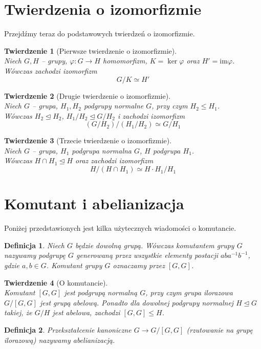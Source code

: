 \documentclass[licencjacka]{pracamgr}
\newtheorem{deff}{Definicja}[section]
\newtheorem{thh}{Twierdzenie}[section]
\begin{document}
\section{Twierdzenia o izomorfizmie}
Przejdźmy teraz do podstawowych twierdzeń o izomorfizmie.
\begin{thh}[Pierwsze twierdzenie o izomorfizmie] $ $ \\
	Niech $G, H$ -- grupy, 	$ \varphi \colon G \to H$ homomorfizm, $K = \ker{\varphi}$ oraz $H' = \mathrm{im}\varphi $. \\
	Wówczas zachodzi izomorfizm $$G/K \simeq H'$$
\end{thh}
\begin{thh}[Drugie twierdzenie o izomorfizmie]$ $\\
	Niech $G$ -- grupa, 	$H_1, H_2$ podgrupy normalne $G$, przy czym $H_2 \leq H_1$. \\
	Wówczas $H_2 \trianglelefteq H_2$, $H_1/H_2 \trianglelefteq G/H_2$ i zachodzi izomorfizm
	$$ (G/H_2) / (H_1/H_2) \simeq G/H_1$$
\end{thh}
\begin{thh}[Trzecie twierdzenie o izomorfizmie] $ $ \\
	Niech $G$ -- grupa, $H_1$ podgrupa normalna $G$, $H$ podgrupa $H_1$. \\
	Wówczas $H\cap H_1 \trianglelefteq H$ oraz zachodzi izomorfizm
	$$ H/(H\cap H_1) \simeq H \cdot H_1 / H_1 $$
\end{thh}


\section{Komutant i abelianizacja}
Poniżej przedstawionych jest kilka użytecznych wiadomości o komutancie.
\begin{deff}
	Niech $G$ będzie dowolną grupą. Wówczas \emph{komutantem grupy $G$} nazywamy podgrupę $G$ generowaną przez wszystkie elementy postacji
	$aba^{-1}b^{-1}$, gdzie $a, b \in G$. Komutant grupy $G$ oznaczamy przez $[G, G]$.
\end{deff}
\begin{thh}[O komutancie] $ $\\
	Komutant $[G,G]$ jest podgrupą normalną $G$, przy czym grupa ilorazowa $G/[G,G]$ jest grupą abelową.
	Ponadto dla dowolnej podgrupy normalnej $H \trianglelefteq G$ takiej, że $G/H$ jest abelowa, zachodzi $[G,G] \le H$.
\end{thh}
\begin{deff}
	Przekształcenie kanoniczne $G \to G/[G,G]$ (rzutowanie na grupę ilorazową) nazywamy abelianizacją.
\end{deff}
\end{document}
